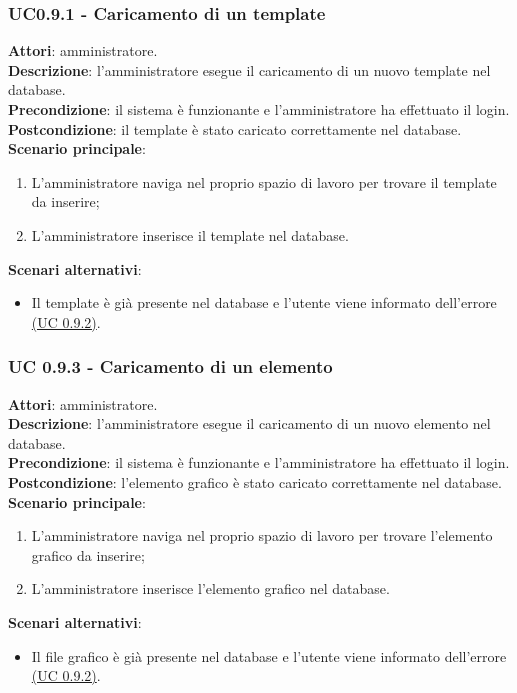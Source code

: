 \subsubsection{UC0.9.1 - Caricamento di un template}{
	\label{uc0.9.1}
	\textbf{Attori}: amministratore. \\
	\textbf{Descrizione}: l'amministratore esegue il caricamento di un nuovo template nel database. \\
	\textbf{Precondizione}: il sistema  è funzionante e l'amministratore ha effettuato il login.	\\
	\textbf{Postcondizione}: il template è stato caricato correttamente nel database.	\\
	\textbf{Scenario principale}:
	\begin{enumerate}
		\item L'amministratore naviga nel proprio spazio di lavoro  per trovare il template da inserire;
		\item L'amministratore inserisce il template nel database.
	\end{enumerate}
	\textbf{Scenari alternativi}:
	\begin{itemize}
		\item Il template è già presente nel database e l'utente viene informato dell'errore \hyperref[uc0.9.2]{(UC 0.9.2)}.
	\end{itemize}
	}
\subsubsection{UC 0.9.3 - Caricamento di un elemento}{
	\label{uc0.9.3}
	\textbf{Attori}: amministratore. \\
	\textbf{Descrizione}: l'amministratore esegue il caricamento di un nuovo elemento nel database. \\
	\textbf{Precondizione}: il sistema  è funzionante e l'amministratore ha effettuato il login.	\\
	\textbf{Postcondizione}: l'elemento grafico è stato caricato correttamente nel database.	\\
	\textbf{Scenario principale}:
	\begin{enumerate}
		\item L'amministratore naviga nel proprio spazio di lavoro per trovare l'elemento grafico da inserire;
		\item L'amministratore inserisce l'elemento grafico nel database.
	\end{enumerate}
	\textbf{Scenari alternativi}:
	\begin{itemize}
		\item Il file grafico è già presente nel database e l'utente viene informato dell'errore \hyperref[uc0.9.2]{(UC 0.9.2)}.
	\end{itemize}
	}
